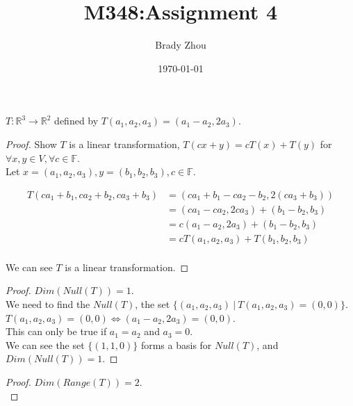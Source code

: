 \documentclass[12pt]{article}
\title{\textbf{M348:\@ Assignment 4}}
\author{Brady Zhou}
\date{\today}
\newenvironment{exercise}[2][Exercise]{\begin{trivlist}
\item[\hskip \labelsep{\bfseries #1}\hskip \labelsep{\bfseries #2.}]}{\end{trivlist}}
\begin{document}
\maketitle

\begin{exercise}{2.1.2} $T: \mathbb{R}^3 \to \mathbb{R}^2$ defined by $T(a_1, a_2, a_3) = (a_1 - a_2, 2a_3)$.

    \begin{proof} Show $T$ is a linear transformation, $T(cx + y) = cT(x) + T(y)$ for $\forall x, y \in V, \forall c \in \mathbb{F}$. \\

        \noindent Let $x = (a_1, a_2, a_3), y = (b_1, b_2, b_3), c \in \mathbb{F}$.

        \begin{align*}
            T (ca_1 + b_1, ca_2 + b_2, ca_3 + b_3) 
            & = (ca_1 + b_1 - ca_2 - b_2, 2(ca_3 + b_3)) \\
            & = (ca_1 - ca_2, 2ca_3) + (b_1 - b_2, b_3) \\
            & = c(a_1 - a_2, 2a_3) + (b_1 - b_2, b_3) \\
            & = c T(a_1, a_2, a_3) + T(b_1, b_2, b_3) \\
        \end{align*}

        \noindent We can see $T$ is a linear transformation.

    \end{proof}

    \begin{proof} $Dim(Null(T)) = 1$. \\

        \noindent We need to find the $Null(T)$, the set $\{(a_1, a_2, a_3)\ |\ T(a_1, a_2, a_3) = (0, 0)\}$. \\
        $T(a_1, a_2, a_3) = (0, 0) \iff (a_1 - a_2, 2a_3) = (0, 0)$. \\
        This can only be true if $a_1 = a_2$ and $a_3 = 0$. \\
        We can see the set $\{(1, 1, 0)\}$ forms a basis for $Null(T)$, and $Dim(Null(T)) = 1$.

    \end{proof}

    \begin{proof} $Dim(Range(T)) = 2$. \\


\end{proof}
\end{exercise}
\end{document}
